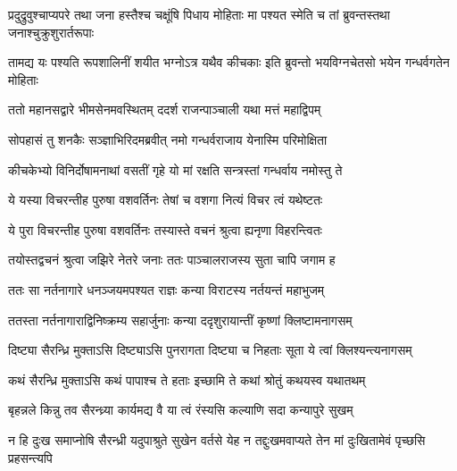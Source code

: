 \twolineshloka
{प्रदुद्रुवुश्चाप्यपरे तथा जना हस्तैश्च चक्षूंषि पिधाय मोहिताः}
{मा पश्यत स्मेति च तां ब्रुवन्तस्तथा जनाश्चुक्रुशुरार्तरूपाः}


\twolineshloka
{तामद्य यः पश्यति रूपशालिनीं शयीत भग्नोऽत्र यथैव कीचकाः}
{इति ब्रुवन्तो भयविग्नचेतसो भयेन गन्धर्वगतेन मोहिताः}


\twolineshloka
{ततो महानसद्वारे भीमसेनमवस्थितम्}
{ददर्श राजन्पाञ्चाली यथा मत्तं महाद्विपम्}


\twolineshloka
{सोपहासं तु शनकैः सञ्ज्ञाभिरिदमब्रवीत्}
{नमो गन्धर्वराजाय येनास्मि परिमोक्षिता}


\twolineshloka
{कीचकेभ्यो विनिर्दोषामनाथां वसतीं गृहे}
{यो मां रक्षति सन्त्रस्तां गन्धर्वाय नमोस्तु ते}




\twolineshloka
{ये यस्या विचरन्तीह पुरुषा वशवर्तिनः}
{तेषां च वशगा नित्यं विचर त्वं यथेष्टतः}


\twolineshloka
{ये पुरा विचरन्तीह पुरुषा वशवर्तिनः}
{तस्यास्ते वचनं श्रुत्वा ह्यनृणा विहरन्त्वितः}



\twolineshloka
{तयोस्तद्वचनं श्रुत्वा जझिरे नेतरे जनाः}
{ततः पाञ्चालराजस्य सुता चापि जगाम ह}


\twolineshloka
{ततः सा नर्तनागारे धनञ्जयमपश्यत}
{राज्ञः कन्या विराटस्य नर्तयन्तं महाभुजम्}


\twolineshloka
{ततस्ता नर्तनागाराद्विनिष्क्रम्य सहार्जुनाः}
{कन्या ददृशुरायान्तीं कृष्णां क्लिष्टामनागसम्}




\twolineshloka
{दिष्ट्या सैरन्ध्रि मुक्ताऽसि दिष्ट्याऽसि पुनरागता}
{दिष्ट्या च निहताः सूता ये त्वां क्लिश्यन्त्यनागसम्}




\twolineshloka
{कथं सैरन्ध्रि मुक्ताऽसि कथं पापाश्च ते हताः}
{इच्छामि ते कथां श्रोतुं कथयस्व यथातथम्}




\twolineshloka
{बृहन्नले किन्नु तव सैरन्ध्र्या कार्यमद्य वै}
{या त्वं रंस्यसि कल्याणि सदा कन्यापुरे सुखम्}


\threelineshloka
{न हि दुःख समाप्नोषि सैरन्ध्री यदुपाश्रुते}
{सुखेन वर्तसे येह न तद्दुःखमवाप्यते}
{तेन मां दुःखितामेवं पृच्छसि प्रहसन्त्यपि}




